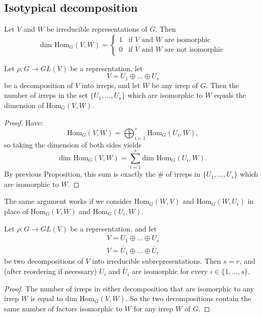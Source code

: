\subsection{Isotypical decomposition}
\begin{frame}
\begin{proposition}
Let $V$ and $W$ be irreducible representations of $G$.  Then
\[ \text{dim Hom}_G (V,W) =  \begin{cases} 
1 & \mbox{if $V$ and $W$ are isomorphic}  \\
0 &\mbox{if $V$ and $W$ are not isomorphic}
\end{cases} \]
\end{proposition}
\end{frame}

\begin{frame}
\begin{proposition}
Let $\rho \colon G \to GL(V)$ be a representation, let \[ V = U_1 \oplus \ldots \oplus U_s \] be a decomposition of $V$ into irreps, and let $W$ be any irrep of $G$.  Then the number of irreps in the set  $ \{ U_1, \ldots, U_s \}$ which are isomorphic to $W$ equals the dimension of $\text{Hom}_G(V,W)$.
\end{proposition}
\end{frame}

\begin{frame}
\begin{proof}
Have:  \[ \text{Hom}_G(V,W) = \bigoplus_{i=1}^s \text{Hom}_G(U_i, W) ,\]
 so taking the dimension of both sides yields \[  \text{dim Hom}_G(V,W) = \sum_{i=1}^s \text{dim Hom}_G(U_i, W). \]
 By previous Proposition, this sum is exactly the \# of irreps in $\{ U_1, \ldots, U_s \}$ which are isomorphic to $W$.
\end{proof}
\end{frame}
\begin{note}
The same argument works if we consider $\text{Hom}_G(W,V)$ and $\text{Hom}_G(W,U_i)$ in place of $\text{Hom}_G(V,W)$ and $\text{Hom}_G(U_i,W)$.
\end{note}

\begin{frame}
\begin{theorem}
Let $\rho \colon G \to GL(V)$ be a representation, and let
\begin{align*}
V = U_1 \oplus \ldots \oplus U_s \\
V = \widetilde{U_1} \oplus \ldots \oplus \widetilde{U_r}
\end{align*}
be two decompositions of $V$ into irreducible subrepresentations.  Then $s = r$, and (after reordering if necessary) $U_i$ and $\widetilde{U_i}$ are isomorphic for every $i \in \{1, \ldots, s\}$.
\end{theorem}
\begin{proof}
The number of irreps in either decomposition that are isomorphic to any irrep $W$ is equal to $\text{dim Hom}_G(V,W)$.  So the two decompositions contain the same number of factors isomorphic to $W$ for any irrep $W$ of $G$.
\end{proof}
\end{frame}

